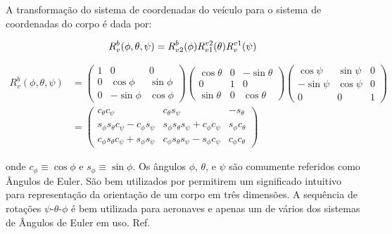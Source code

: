 \documentclass[a4paper, 12pt]{article}
\begin{document}
A transformação do sistema de coordenadas do veículo para o sistema de coordenadas do corpo é dada por:

\begin{equation}
\centering
{ R }_{ v }^{ b }(\phi, \theta, \psi) = 
{ R }_{ v2 }^{ b }(\phi){ R }_{ v1 }^{ v2 }(\theta){ R }_{ v }^{ v1 }(\psi)
\label{eq:rot1}
\end{equation}

\begin{equation}
\begin{aligned}
{ R }_{ v }^{ b }(\phi, \theta, \psi) &= 
\begin{pmatrix} 
	1  & 0 & 0 \\
	0 & \cos {\phi}  &  \sin {\phi} \\
	0 & -\sin {\phi}  & \cos {\phi}	 
\end{pmatrix}
\begin{pmatrix} 
	\cos {\theta}  & 0 & -\sin {\theta} \\
	0  & 1 & 0 \\
	\sin {\theta}  & 0 & \cos  {\theta}	 
\end{pmatrix}
\begin{pmatrix} 
	\cos { \psi  }  & \sin { \psi  } & 0 \\
	 -\sin { \psi  }  & \cos { \psi  } & 0  \\ 
	 0  & 0 & 1 
\end{pmatrix} \\
&=\begin{pmatrix} 
{ c }_{ \theta  }{ c }_{ \psi  } & { c }_{ \theta  }s_{ \psi  } & -{ s }_{ \theta  } \\ { s }_{ \phi  }{ s }_{ \theta  }{ c }_{ \psi  }-{ c }_{ \phi  }{ s }_{ \psi  } & { s }_{ \phi  }{ s }_{ \theta  }{ s }_{ \psi  }+{ c }_{ \phi  }{ c }_{ \psi  } & { s }_{ \phi  }{ c }_{ \theta  } \\ { c }_{ \phi  }{ s }_{ \theta  }{ c }_{ \psi  }+{ s }_{ \phi  }{ s }_{ \psi  } & { c }_{ \phi  }{ s }_{ \theta  }{ s }_{ \psi  }-{ s }_{ \phi  }{ c }_{ \psi  } & { c }_{ \phi  }{ c }_{ \theta  } 
\end{pmatrix} 
\end{aligned}
\label{eq:rot2}
\end{equation}

\noindent onde ${ c }_{ \phi  }\equiv \cos { \phi  } $ e ${ s }_{ \phi  }\equiv \sin { \phi  } $. Os ângulos $\phi$, $\theta$, e $\psi$ são comumente referidos como Ângulos de Euler. São bem utilizados por permitirem um significado intuitivo para representação da orientação de um corpo em três dimensões. A sequência de rotações $\psi$-$\theta$-$\phi$ é bem utilizada para aeronaves e apenas um de vários dos sistemas de Ângulos de Euler em uso. Ref. 
\end{document}
